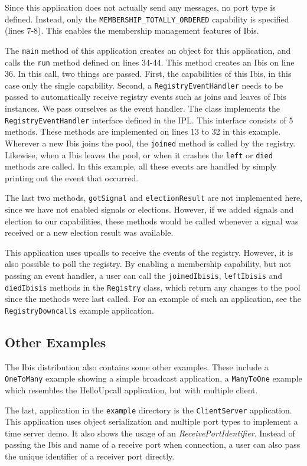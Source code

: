 Since this application does not actually send any messages, no port type
is defined. Instead, only the \texttt{MEMBERSHIP\_TOTALLY\_ORDERED}
capability is specified (lines 7-8). This enables the membership
management features of Ibis.

The \texttt{main} method of this application creates an object for this
application, and calls the \texttt{run} method defined on lines 34-44.
This method creates an Ibis on line 36. In this call, two things are
passed. First, the capabilities of this Ibis, in this case only the
single capability. Second, a \texttt{RegistryEventHandler} needs to be
passed to automatically receive registry events such as joins and leaves
of Ibis instances. We pass ourselves as the event handler. The class
implements the \texttt{RegistryEventHandler} interface defined in the
IPL. This interface consists of 5 methods. These methods are implemented
on lines 13 to 32 in this example. Wherever a new Ibis joins the pool,
the \texttt{joined} method is called by the registry. Likewise, when a
Ibis leaves the pool, or when it crashes the \texttt{left} or
\texttt{died} methods are called. In this example, all these events are
handled by simply printing out the event that occurred.

The last two methods, \texttt{gotSignal} and \texttt{electionResult} are
not implemented here, since we have not enabled signals or elections.
However, if we added signals and election to our capabilities, these
methods would be called whenever a signal was received or a new election
result was available.

This application uses upcalls to receive the events of the registry.
However, it is also possible to poll the registry. By enabling a
membership capability, but not passing an event handler, a user can call
the \texttt{joinedIbisis}, \texttt{leftIbisis} and \texttt{diedIbisis}
methods in the \texttt{Registry} class, which return any changes to the
pool since the methods were last called. For an example of such an
application, see the \texttt{RegistryDowncalls} example application.

\subsection{Other Examples}

The Ibis distribution also contains some other examples. These include
a \texttt{OneToMany} example showing a simple broadcast application, a
\texttt{ManyToOne} example which resembles the HelloUpcall application,
but with multiple client.

The last, application in the \texttt{example} directory is
the \texttt{ClientServer} application. This application uses object
serialization and multiple port types to implement a time server demo.
It also shows the usage of an \emph{ReceivePortIdentifier}. Instead of
passing the Ibis and name of a receive port when connection, a user can
also pass the unique identifier of a receiver port directly.

